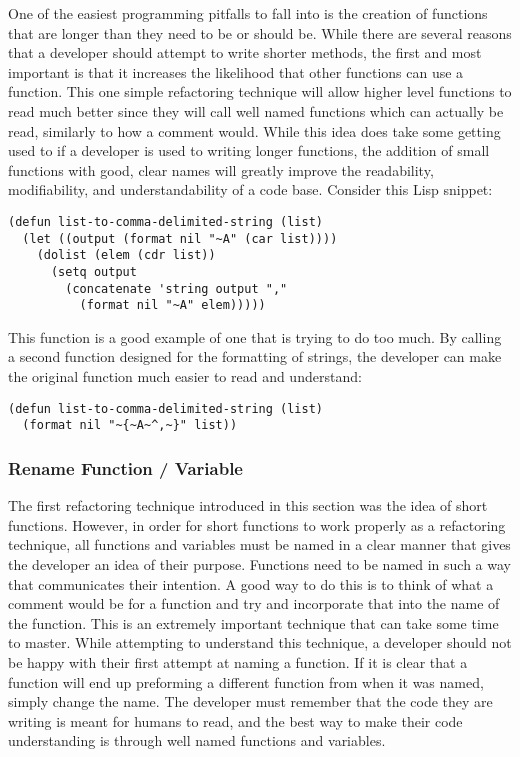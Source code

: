 One of the easiest programming pitfalls to fall into is the creation of functions that are longer than they need to be or should be. While there are several reasons that a developer should attempt to write shorter methods, the first and most important is that it increases the likelihood that other functions can use a function. This one simple refactoring technique will allow higher level functions to read much better since they will call well named functions which can actually be read, similarly to how a comment would. While this idea does take some getting used to if a developer is used to writing longer functions, the addition of small functions with good, clear names will greatly improve the readability, modifiability, and understandability of a code base. Consider this Lisp snippet:

\begin{verbatim}
(defun list-to-comma-delimited-string (list)
  (let ((output (format nil "~A" (car list))))
    (dolist (elem (cdr list))
      (setq output 
        (concatenate 'string output "," 
          (format nil "~A" elem)))))
\end{verbatim}

This function is a good example of one that is trying to do too much. By calling a second function designed for the formatting of strings, the developer can make the original function much easier to read and understand:

\begin{verbatim}
(defun list-to-comma-delimited-string (list)
  (format nil "~{~A~^,~}" list))
\end{verbatim}

\subsubsection{Rename Function / Variable}

The first refactoring technique introduced in this section was the idea of short functions. However, in order for short functions to work properly as a refactoring technique, all functions and variables must be named in a clear manner that gives the developer an idea of their purpose. Functions need to be named in such a way that communicates their intention. A good way to do this is to think of what a comment would be for a function and try and incorporate that into the name of the function. This is an extremely important technique that can take some time to master. While attempting to understand this technique, a developer should not be happy with their first attempt at naming a function. If it is clear that a function will end up preforming a different function from when it was named, simply change the name. The developer must remember that the code they are writing is meant for humans to read, and the best way to make their code understanding is through well named functions and variables\cite{lisprefactoring}. 

